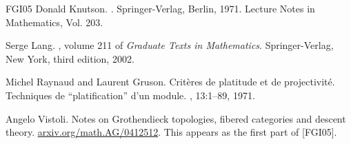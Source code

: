 \begin{thebibliography}{FGI{\etalchar{+}}05}
 Donald Knutson.
 .
 \newblock Springer-Verlag, Berlin, 1971.
 \newblock Lecture Notes in Mathematics, Vol. 203.

 Serge Lang.
 , volume 211 of {\em Graduate Texts in Mathematics}.
 \newblock Springer-Verlag, New York, third edition, 2002.

 Michel Raynaud and Laurent Gruson.
 \newblock Crit\`eres de platitude et de projectivit\'e. {T}echniques de
   ``platification'' d'un module.
 , 13:1--89, 1971.

 Angelo Vistoli.
 \newblock Notes on Grothendieck topologies, fibered categories and descent theory.
 \newblock \url{arxiv.org/math.AG/0412512}. This appears as the first part
   of [FGI{\etalchar{+}}05].

 \end{thebibliography}
